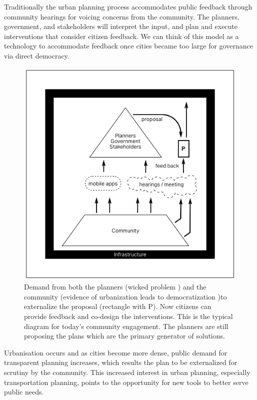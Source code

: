 Traditionally the urban planning process accommodates public feedback through community hearings for voicing concerns from the community. The planners, government, and stakeholders will interpret the input, and plan and execute interventions that consider citizen feedback. We can think of this model as a technology to accommodate feedback once cities became too large for governance via direct democracy.

\begin{figure}[!htb]
 	\includegraphics[width=\textwidth]{chapters/1/fig/community_engagement.png}               
 	 \caption[externalized proposal]{Demand from both the planners (wicked problem \cite{churchman1967guest}) and the community (evidence of urbanization leads to democratization \cite{woolley2010evidence} )to externalize the proposal (rectangle with P). Now citizens can provide feedback and co-design the interventions. This is the typical diagram for today's community engagement. The planners are still proposing the plans which are the primary generator of solutions.}
  	\label{fig:spin_margin}
\end{figure}

Urbanisation occurs and as cities become more dense, public demand for transparent planning increases, which results the plan to be externalized for scrutiny by the community. This increased interest in urban planning, especially transportation planning, points to the opportunity for new tools to better serve public needs.

